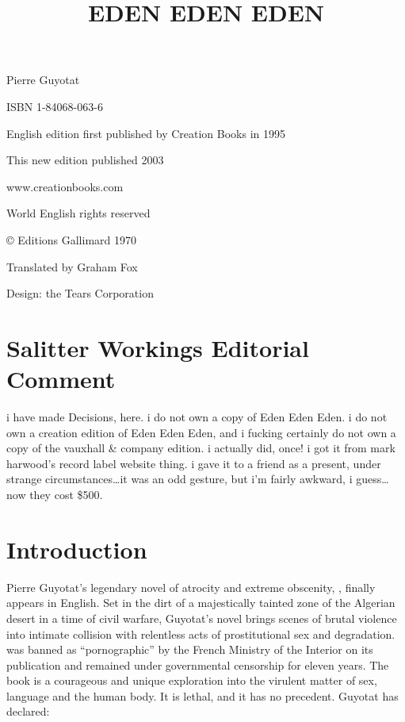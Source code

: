 \documentclass[10pt,twoside]{memoir}
\begin{document}
\graphicspath{{img/}}

\frontmatter

{
\title{EDEN EDEN EDEN}

}

\clearpage

{

Pierre Guyotat

ISBN 1-84068-063-6

English edition first published by Creation Books in 1995

This new edition published 2003

www.creationbooks.com

World English rights reserved

© Editions Gallimard 1970

Translated by Graham Fox

Design: the Tears Corporation
}
\clearpage

\chapter{Salitter Workings Editorial Comment}

i have made Decisions, here. i do not own a copy of Eden Eden Eden. i do not own a creation edition
of Eden Eden Eden, and i fucking certainly do not own a copy of the vauxhall \& company edition. i
actually did, once! i got it from mark harwood's record label website thing. i gave it to a friend
as a present, under strange circumstances\ldots it was an odd gesture, but i'm fairly awkward, i
guess\ldots now they cost \$500. 




\clearpage

\chapter{Introduction}

Pierre Guyotat's legendary novel of atrocity and extreme obscenity, ,
finally appears in English. Set in the dirt of a majestically tainted zone of the Algerian desert in
a time of civil warfare, Guyotat's novel brings scenes of brutal violence into intimate collision
with relentless acts of prostitutional sex and degradation.  was banned as
\enquote{pornographic} by the French Ministry of the Interior on its publication and remained under
governmental censorship for eleven years. The book is a courageous and unique exploration into the
virulent matter of sex, language and the human body. It is lethal, and it has no precedent. Guyotat
has declared: 
\end{document}
